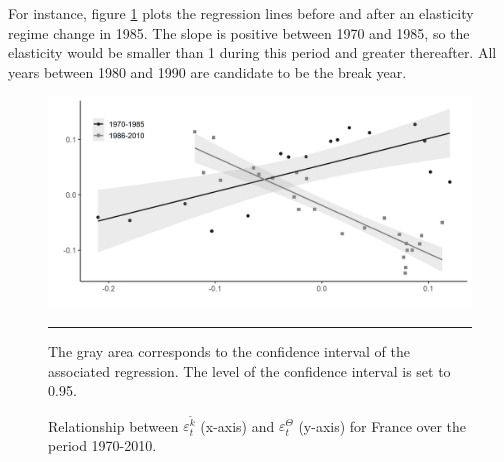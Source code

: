 For instance, figure \ref{fig:k_Theta_log_reg85} plots the regression lines before and after an elasticity regime change in 1985. The slope is positive between 1970 and 1985, so the elasticity would be smaller than 1 during this period and greater thereafter. All years between 1980 and 1990 are candidate to be the break year.
\begin{figure}[tb]
	\centering
	\includegraphics[width=1\linewidth]{../result/appendix_CD/k_Theta_log_reg85.png}
	\caption{Relationship between $\varepsilon_t^{\tilde{k}}$ (x-axis) and $\varepsilon_t^\Theta$ (y-axis) for France over the period 1970-2010.}
	\label{fig:k_Theta_log_reg85}
	\vspace{.5ex}
	\hrule
	\vspace{-4ex}
	\justify\singlespacing\footnotesize The gray area corresponds to the confidence interval of the associated regression. The level of the confidence interval is set to 0.95.
\end{figure}

